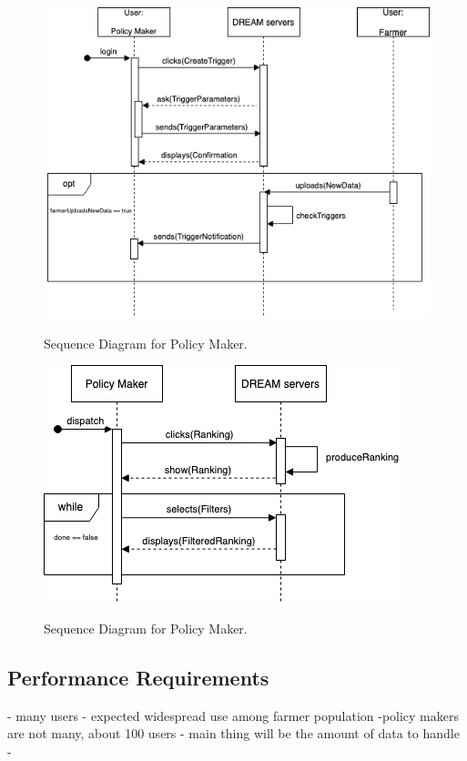 \begin{figure}[hbt!]
\centering
\includegraphics[scale=0.6]{Files/sequence_disgrams/thePNGs/policy_setTrigger.png}\\
\caption{\label{fig:policySeqSetTrig}Sequence Diagram for Policy Maker.}
\end{figure}

\begin{figure}[hbt!]
\centering
\includegraphics[scale=0.6]{Files/sequence_disgrams/thePNGs/policy_viewRanking.png}\\
\caption{\label{fig:policySeqViewRank}Sequence Diagram for Policy Maker.}
\end{figure}


\subsection{Performance Requirements}
- many users
- expected widespread use among farmer population
-policy makers are not many, about 100 users
- main thing will be the amount of data to handle
- 


